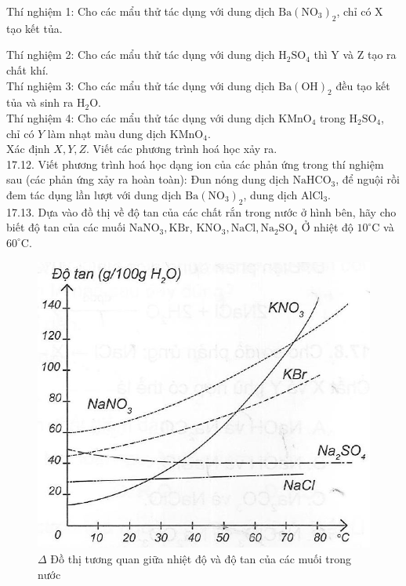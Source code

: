 \documentclass[10pt]{article}
\begin{document}
Thí nghiệm 1: Cho các mẩu thử tác dụng với dung dịch $\mathrm{Ba}\left(\mathrm{NO}_{3}\right)_{2}$, chỉ có X tạo kết tủa.

Thí nghiệm 2: Cho các mẩu thử tác dụng với dung dịch $\mathrm{H}_{2} \mathrm{SO}_{4}$ thì Y và Z tạo ra chất khí.\\
Thí nghiệm 3: Cho các mẩu thử tác dụng với dung dịch $\mathrm{Ba}(\mathrm{OH})_{2}$ đều tạo kết tủa và sinh ra $\mathrm{H}_{2} \mathrm{O}$.\\
Thí nghiệm 4: Cho các mẩu thử tác dụng với dung dịch $\mathrm{KMnO}_{4}$ trong $\mathrm{H}_{2} \mathrm{SO}_{4}$, chỉ có $Y$ làm nhạt màu dung dịch $\mathrm{KMnO}_{4}$.\\
Xác định $X, Y, Z$. Viết các phương trình hoá học xảy ra.\\
17.12. Viết phương trình hoá học dạng ion của các phản ứng trong thí nghiệm sau (các phản ứng xảy ra hoàn toàn): Đun nóng dung dịch $\mathrm{NaHCO}_{3}$, để nguội rồi đem tác dụng lần lượt với dung dịch $\mathrm{Ba}\left(\mathrm{NO}_{3}\right)_{2}$, dung dịch $\mathrm{AlCl}_{3}$.\\
17.13. Dựa vào đồ thị về độ tan của các chất rắn trong nước ở hình bên, hãy cho biết độ tan của các muối $\mathrm{NaNO}_{3}, \mathrm{KBr}$, $\mathrm{KNO}_{3}, \mathrm{NaCl}, \mathrm{Na}_{2} \mathrm{SO}_{4}$ Ở nhiệt độ $10^{\circ} \mathrm{C}$ và $60^{\circ} \mathrm{C}$.

\begin{figure}[h]
\begin{center}
  \includegraphics[width=\textwidth]{2025_10_23_de6f5713836e4e91b3c8g-104}
\captionsetup{labelformat=empty}
\caption{$\Delta$ Đồ thị tương quan giữa nhiệt độ và độ tan của các muối trong nước}
\end{center}
\end{figure}
\end{document}
